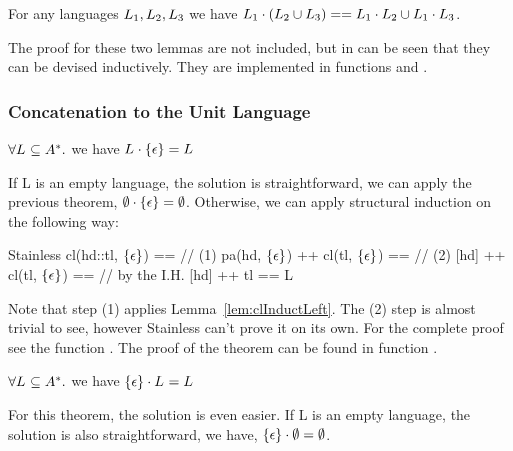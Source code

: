 \begin{lemma}
	\label{lem:clRightDistributiveAppend}
	For any languages $L_{1}, L_{2}, L_{3}$ we have $L_{1} \cdot (L_{2} \cup L_{3}) == L_{1} \cdot L_{2} \cup L_{1} \cdot L_{3}$.
\end{lemma}

The proof for these two lemmas are not included, but in can be seen that they can be devised inductively. They are implemented in functions  and .

\subsubsection{Concatenation to the Unit Language}

\begin{theorem}
	\label{the:rightUnitConcat}
	$\forall L_{} \subseteq A^{*}.$ we have  $L_{} \cdot \{\epsilon\} = L_{}$
\end{theorem}

If L is an empty language, the solution is straightforward, we can apply the previous theorem, $\emptyset \cdot \{\epsilon\} = \emptyset$. Otherwise, we can apply structural induction on  the following way:

\begin{ShortCode}{Stainless}
 cl(hd::tl, $\{\epsilon\}$)              == // (1)
 pa(hd, $\{\epsilon\}$) ++ cl(tl, $\{\epsilon\}$)      == // (2)
 [hd] ++ cl(tl, $\{\epsilon\}$)          == // by the I.H.
 [hd] ++ tl                ==
 L 
\end{ShortCode}

Note that step (1) applies Lemma~\ref{lem:clInductLeft}. The (2) step is almost trivial to see, however Stainless can't prove it on its own. For the complete proof see the function . The proof of the theorem can be found in function .

\begin{theorem}
	\label{the:leftUnitConcat}
	$\forall L_{} \subseteq A^{*}.$ we have $\{\epsilon\} \cdot L_{} = L_{}$
\end{theorem}


For this theorem, the solution is even easier. If L is an empty language, the solution is also straightforward, we have, $\{\epsilon\} \cdot \emptyset = \emptyset$.


